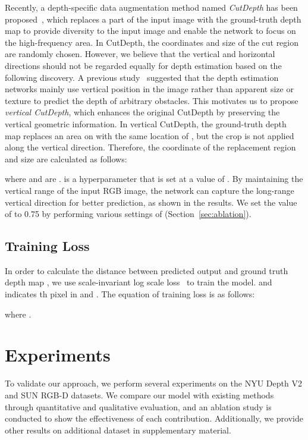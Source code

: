 \documentclass{article}
\makeatletter
\let\@internalcite\cite
\def\cite{\def\citeauthoryear##1##2{##1, ##2}\@internalcite}
\makeatother
\begin{document}
Recently, a depth-specific data augmentation method named \textit{CutDepth} has been proposed~\cite{ishii2021cutdepth}, which replaces a part of the input image with the ground-truth depth map to provide diversity to the input image and enable the network to focus on the high-frequency area. 
In CutDepth, the coordinates  and size  of the cut region are randomly chosen. 
However, we believe that the vertical and horizontal directions should not be regarded equally for depth estimation based on the following discovery.
A previous study~\cite{dijk2019neural} suggested that the depth estimation networks mainly use vertical position in the image rather than apparent size or texture to predict the depth of arbitrary obstacles. 
This motivates us to propose \textit{vertical CutDepth}, which enhances the original CutDepth by preserving the vertical geometric information.
In vertical CutDepth, the ground-truth depth map replaces an area on  with the same location of , but the crop is not applied along the vertical direction.
Therefore, the coordinate of the replacement region  and size  are calculated as follows:
\iffalse

\fi

\noindent where  and  are .  is a hyperparameter that is set at a value of . By maintaining the vertical range of the input RGB image, the network can capture the long-range vertical direction for better prediction, as shown in the results. We set the value of  to 0.75 by performing various settings of  (Section~\ref{sec:ablation}).


\subsection{Training Loss}
In order to calculate the distance between predicted output  and ground truth depth map ,  we use scale-invariant log scale loss~\cite{eigen2014depth} to train the model.  and  indicates th pixel in  and . The equation of training loss is as follows:


where .

\section{Experiments}
To validate our approach, we perform several experiments on the NYU Depth V2 and SUN RGB-D datasets. We compare our model with existing methods through quantitative and qualitative evaluation, and an ablation study is conducted to show the effectiveness of each contribution. Additionally, we provide other results on additional dataset in supplementary material.
\end{document}
